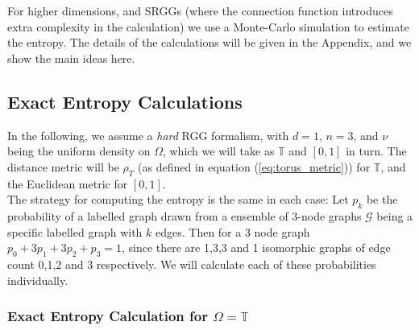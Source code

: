 \documentclass{article}
\begin{document}
For higher dimensions, and SRGGs (where the connection function introduces extra complexity in the calculation) we use a Monte-Carlo simulation to estimate the entropy. The details of the calculations will be given in the Appendix, and we show the main ideas here. \newline

\subsection{Exact Entropy Calculations}

In the following, we assume a \textit{hard} RGG formalism, with $d=1$, $n=3$, and $\nu$ being the uniform density on $\Omega$, which we will take as $\mathbb{T}$ and $[0,1]$ in turn. The distance metric will be $\rho_T$ (as defined in equation (\ref{eq:torus_metric})) for $\mathbb{T}$, and the Euclidean metric for $[0,1]$. \\

The strategy for computing the entropy is the same in each case: Let $p_k$ be the probability of a labelled graph drawn from a ensemble of 3-node graphs $\mathcal{G}$ being a specific labelled graph with $k$ edges. Then for a 3 node graph $p_0+3p_1+3p_2+p_3 = 1$, since there are 1,3,3 and 1 isomorphic graphs of edge count 0,1,2 and 3 respectively. We will calculate each of these probabilities individually.

\subsubsection{Exact Entropy Calculation for $\Omega = \mathbb{T}$}
\end{document}
